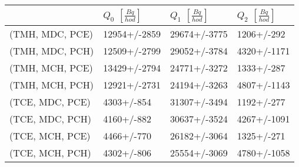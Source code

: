 \begin{tabular}{llll}
\toprule
{} & $Q_0$ $\left[\si{\frac{Bq}{hod}}\right]$ & $Q_1$ $\left[\si{\frac{Bq}{hod}}\right]$ & $Q_2$ $\left[\si{\frac{Bq}{hod}}\right]$ \\
\midrule
(TMH, MDC, PCE) &                             12954+/-2859 &                             29674+/-3775 &                               1206+/-292 \\
(TMH, MDC, PCH) &                             12509+/-2799 &                             29052+/-3784 &                              4320+/-1171 \\
(TMH, MCH, PCE) &                             13429+/-2794 &                             24771+/-3272 &                               1333+/-287 \\
(TMH, MCH, PCH) &                             12921+/-2731 &                             24194+/-3263 &                              4807+/-1143 \\
(TCE, MDC, PCE) &                               4303+/-854 &                             31307+/-3494 &                               1192+/-277 \\
(TCE, MDC, PCH) &                               4160+/-882 &                             30637+/-3524 &                              4267+/-1091 \\
(TCE, MCH, PCE) &                               4466+/-770 &                             26182+/-3064 &                               1325+/-271 \\
(TCE, MCH, PCH) &                               4302+/-806 &                             25554+/-3069 &                              4780+/-1058 \\
\bottomrule
\end{tabular}

